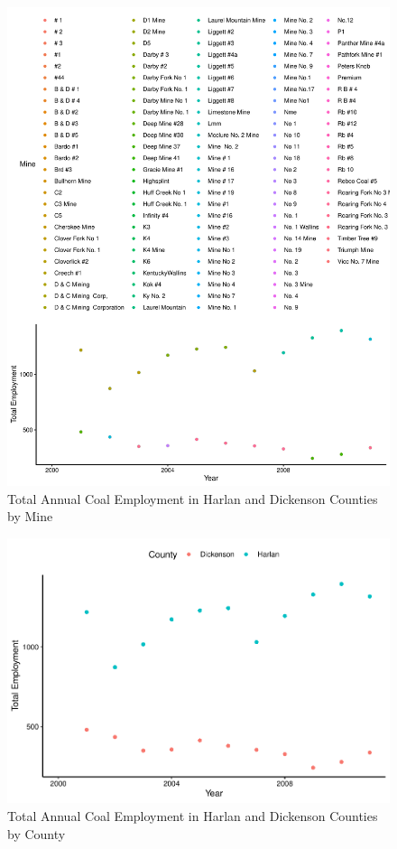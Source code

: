 \documentclass[12pt,]{article}
\begin{document}
\begin{figure}
\centering
\includegraphics{Smith_ENV872_Project_files/figure-latex/unnamed-chunk-8-1.pdf}
\caption{\label{fig:figs} Total Annual Coal Employment in Harlan and
Dickenson Counties by Mine}
\end{figure}

\begin{figure}
\centering
\includegraphics{Smith_ENV872_Project_files/figure-latex/unnamed-chunk-9-1.pdf}
\caption{\label{fig:figs} Total Annual Coal Employment in Harlan and
Dickenson Counties by County}
\end{figure}
\end{document}

